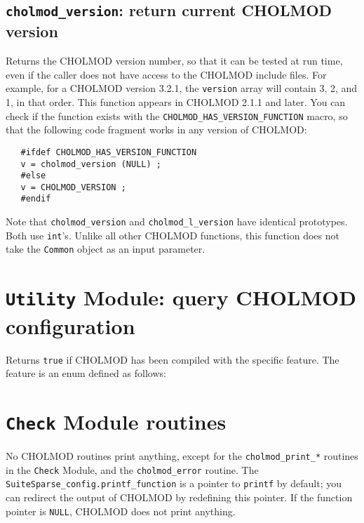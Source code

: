 \documentclass[11pt]{article}
\begin{document}
\subsection{{\tt cholmod\_version}: return current CHOLMOD version}


Returns the CHOLMOD version number, so that it can be tested at run time, even
if the caller does not have access to the CHOLMOD include files.  For example,
for a CHOLMOD version 3.2.1, the {\tt version} array will contain 3, 2, and 1,
in that order.  This function appears in CHOLMOD 2.1.1 and later.  You can
check if the function exists with the {\tt CHOLMOD\_HAS\_VERSION\_FUNCTION}
macro, so that the following code fragment works in any version of CHOLMOD:

\begin{verbatim}
   #ifdef CHOLMOD_HAS_VERSION_FUNCTION
   v = cholmod_version (NULL) ;
   #else
   v = CHOLMOD_VERSION ;
   #endif
\end{verbatim}

Note that {\tt cholmod\_version} and {\tt cholmod\_l\_version} have identical
prototypes.  Both use {\tt int}'s.  Unlike all other CHOLMOD functions, this
function does not take the {\tt Common} object as an input parameter.

\newpage \section{{\tt Utility} Module: query CHOLMOD configuration}


Returns \verb'true' if CHOLMOD has been compiled with the specific feature.
The feature is an enum defined as follows:



\newpage \section{{\tt Check} Module routines}

No CHOLMOD routines print anything, except for the {\tt cholmod\_print\_*}
routines in the {\tt Check} Module, and the {\tt cholmod\_error} routine.  The
{\tt SuiteSparse\_config.printf\_function} is a pointer to {\tt printf} by
default; you can redirect the output of CHOLMOD by redefining this pointer.  If
the function pointer is {\tt NULL}, CHOLMOD does not print anything.
\end{document}

